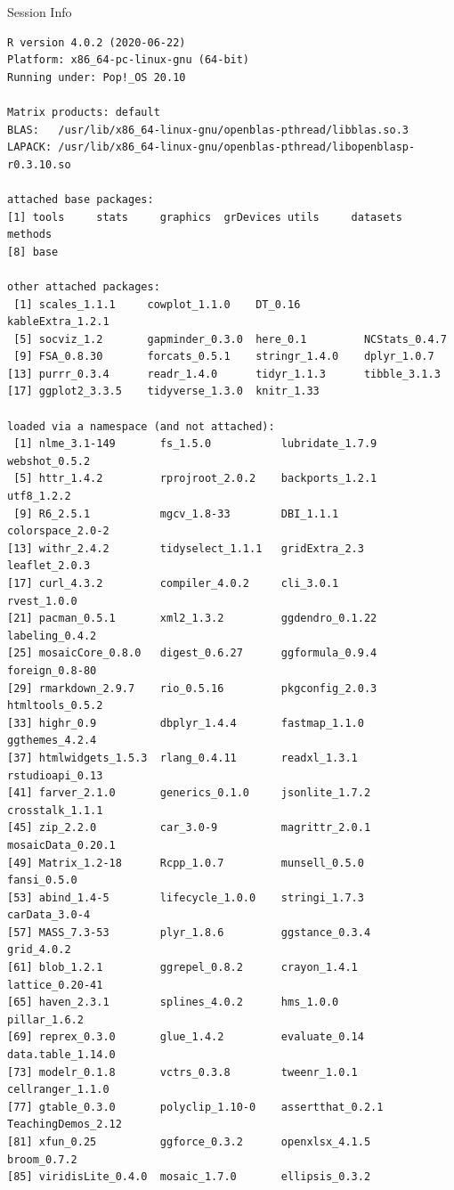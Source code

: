 \documentclass[10pt,handout]{beamer}\usepackage[]{graphicx}\usepackage[]{color}
\makeatletter
\newenvironment{kframe}{%
 \def\at@end@of@kframe{}%
 \ifinner\ifhmode%
  \def\at@end@of@kframe{\end{minipage}}%
  \begin{minipage}{\columnwidth}%
 \fi\fi%
 \def\FrameCommand##1{\hskip\@totalleftmargin \hskip-\fboxsep
 \colorbox{shadecolor}{##1}\hskip-\fboxsep
     \hskip-\linewidth \hskip-\@totalleftmargin \hskip\columnwidth}%
 \MakeFramed {\advance\hsize-\width
   \@totalleftmargin\z@ \linewidth\hsize
   \@setminipage}}%
 {\par\unskip\endMakeFramed%
 \at@end@of@kframe}
\newenvironment{knitrout}{}{} %
\makeatother
\begin{document}
	\begin{frame}[fragile]{Session Info}
	\tiny
	
\begin{knitrout}\tiny
{}\color{fgcolor}\begin{kframe}
\begin{verbatim}
R version 4.0.2 (2020-06-22)
Platform: x86_64-pc-linux-gnu (64-bit)
Running under: Pop!_OS 20.10

Matrix products: default
BLAS:   /usr/lib/x86_64-linux-gnu/openblas-pthread/libblas.so.3
LAPACK: /usr/lib/x86_64-linux-gnu/openblas-pthread/libopenblasp-r0.3.10.so

attached base packages:
[1] tools     stats     graphics  grDevices utils     datasets  methods  
[8] base     

other attached packages:
 [1] scales_1.1.1     cowplot_1.1.0    DT_0.16          kableExtra_1.2.1
 [5] socviz_1.2       gapminder_0.3.0  here_0.1         NCStats_0.4.7   
 [9] FSA_0.8.30       forcats_0.5.1    stringr_1.4.0    dplyr_1.0.7     
[13] purrr_0.3.4      readr_1.4.0      tidyr_1.1.3      tibble_3.1.3    
[17] ggplot2_3.3.5    tidyverse_1.3.0  knitr_1.33      

loaded via a namespace (and not attached):
 [1] nlme_3.1-149       fs_1.5.0           lubridate_1.7.9    webshot_0.5.2     
 [5] httr_1.4.2         rprojroot_2.0.2    backports_1.2.1    utf8_1.2.2        
 [9] R6_2.5.1           mgcv_1.8-33        DBI_1.1.1          colorspace_2.0-2  
[13] withr_2.4.2        tidyselect_1.1.1   gridExtra_2.3      leaflet_2.0.3     
[17] curl_4.3.2         compiler_4.0.2     cli_3.0.1          rvest_1.0.0       
[21] pacman_0.5.1       xml2_1.3.2         ggdendro_0.1.22    labeling_0.4.2    
[25] mosaicCore_0.8.0   digest_0.6.27      ggformula_0.9.4    foreign_0.8-80    
[29] rmarkdown_2.9.7    rio_0.5.16         pkgconfig_2.0.3    htmltools_0.5.2   
[33] highr_0.9          dbplyr_1.4.4       fastmap_1.1.0      ggthemes_4.2.4    
[37] htmlwidgets_1.5.3  rlang_0.4.11       readxl_1.3.1       rstudioapi_0.13   
[41] farver_2.1.0       generics_0.1.0     jsonlite_1.7.2     crosstalk_1.1.1   
[45] zip_2.2.0          car_3.0-9          magrittr_2.0.1     mosaicData_0.20.1 
[49] Matrix_1.2-18      Rcpp_1.0.7         munsell_0.5.0      fansi_0.5.0       
[53] abind_1.4-5        lifecycle_1.0.0    stringi_1.7.3      carData_3.0-4     
[57] MASS_7.3-53        plyr_1.8.6         ggstance_0.3.4     grid_4.0.2        
[61] blob_1.2.1         ggrepel_0.8.2      crayon_1.4.1       lattice_0.20-41   
[65] haven_2.3.1        splines_4.0.2      hms_1.0.0          pillar_1.6.2      
[69] reprex_0.3.0       glue_1.4.2         evaluate_0.14      data.table_1.14.0 
[73] modelr_0.1.8       vctrs_0.3.8        tweenr_1.0.1       cellranger_1.1.0  
[77] gtable_0.3.0       polyclip_1.10-0    assertthat_0.2.1   TeachingDemos_2.12
[81] xfun_0.25          ggforce_0.3.2      openxlsx_4.1.5     broom_0.7.2       
[85] viridisLite_0.4.0  mosaic_1.7.0       ellipsis_0.3.2    
\end{verbatim}
\end{kframe}
\end{knitrout}
	
\end{frame}
\end{document}
